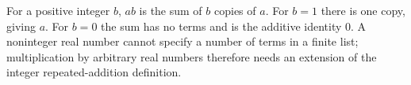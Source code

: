 For a positive integer $b$, $ab$ is the sum of $b$ copies of $a$. For $b=1$ there is one copy, giving $a$. For $b=0$ the sum has no terms and is the additive identity $0$. A noninteger real number cannot specify a number of terms in a finite list; multiplication by arbitrary real numbers therefore needs an extension of the integer repeated-addition definition.
